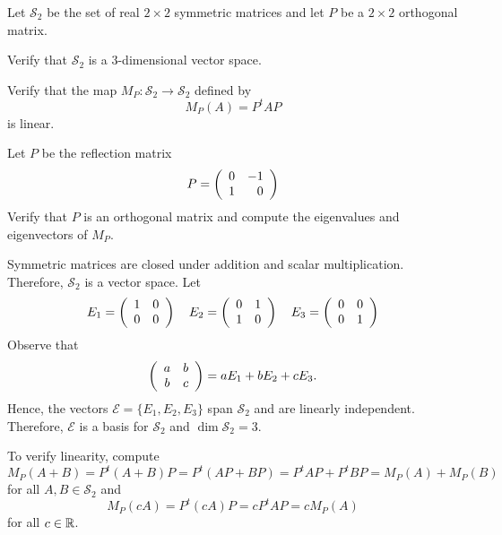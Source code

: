 \documentclass{ximera}
\author{Marty Golubitsky}
\begin{document}

\begin{exercise}\label{c10.3.10}

Let $\mathcal{S}_2$ be the set of real $2\times 2$ symmetric matrices and let $P$ be a $2\times 2$ orthogonal matrix.
\begin{enumeratea}
\item Verify that $\mathcal{S}_2$ is a 3-dimensional vector space.

\item Verify that the map $M_P: \mathcal{S}_2 \to \mathcal{S}_2$ defined by 
\[
M_P(A) = P^tAP
\]
is linear.

\item Let $P$ be the reflection matrix 
\begin{equation} \label{e:reflection_matrix}
P = \left(\begin{array}{rrrrrrrrrrrrrrrrrr} 0 & -1 \\ 1 & 0  \end{array}\right)
\end{equation}
Verify that $P$ is an orthogonal matrix and compute the eigenvalues and eigenvectors of $M_P$.

\end{enumeratea}

\begin{solution}
\soln 
\begin{enumeratea}
\item Symmetric matrices are closed under addition and scalar multiplication.  Therefore, $\mathcal{S}_2$ is a vector space. Let  
\begin{equation} \label{e:sym_mat_base}
E_1 = \left(\begin{array}{cccccccccccc} 1 & 0 \\ 0 & 0 \end{array}\right) \quad E_2 = \left(\begin{array}{cccccccccccc} 0& 1 \\ 1 & 0 \end{array}\right) \quad E_3 = \left(\begin{array}{rrrrrrrrrrrrrrrrrr} 0 & 0 \\ 0 & 1 \end{array}\right)
\end{equation}
Observe that 
\[
\left(\begin{array}{cccccccccccc} a & b \\ b & c \end{array}\right) = aE_1 + bE_2 + cE_3.
\]
Hence, the vectors $\mathcal{E} = \{E_1,E_2,E_3\}$ span $\mathcal{S}_2$ and are linearly independent.  Therefore,  $\mathcal{E}$ is a basis for $\mathcal{S}_2 $ and $\dim \mathcal{S}_2 = 3$.

\item To verify linearity, compute
\[
M_P(A+B) = P^t(A+B)P = P^t(AP + BP) = P^tAP + P^tBP = M_P(A) + M_P(B)
\]
for all $A,B\in \mathcal{S}_2$ and
\[ 
M_P(cA) = P^t(cA)P = c P^tAP = cM_P(A)
\]
for all $c\in\mbox{$\Bbb{R}$}$.


\end{enumeratea}
\end{solution}
\end{exercise}
\end{document}
